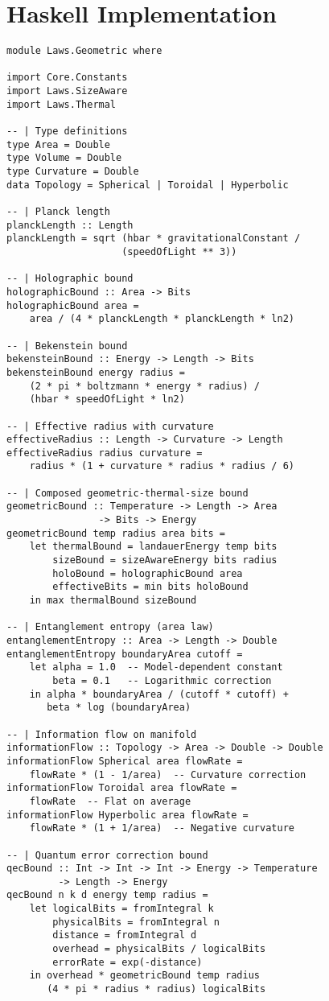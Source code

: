 \documentclass[11pt,a4paper]{article}
\theoremstyle{definition}
\begin{document}
\section{Haskell Implementation}

\begin{lstlisting}
module Laws.Geometric where

import Core.Constants
import Laws.SizeAware
import Laws.Thermal

-- | Type definitions
type Area = Double
type Volume = Double
type Curvature = Double
data Topology = Spherical | Toroidal | Hyperbolic

-- | Planck length
planckLength :: Length
planckLength = sqrt (hbar * gravitationalConstant / 
                    (speedOfLight ** 3))

-- | Holographic bound
holographicBound :: Area -> Bits
holographicBound area =
    area / (4 * planckLength * planckLength * ln2)

-- | Bekenstein bound
bekensteinBound :: Energy -> Length -> Bits
bekensteinBound energy radius =
    (2 * pi * boltzmann * energy * radius) / 
    (hbar * speedOfLight * ln2)

-- | Effective radius with curvature
effectiveRadius :: Length -> Curvature -> Length
effectiveRadius radius curvature =
    radius * (1 + curvature * radius * radius / 6)

-- | Composed geometric-thermal-size bound
geometricBound :: Temperature -> Length -> Area 
                -> Bits -> Energy
geometricBound temp radius area bits =
    let thermalBound = landauerEnergy temp bits
        sizeBound = sizeAwareEnergy bits radius
        holoBound = holographicBound area
        effectiveBits = min bits holoBound
    in max thermalBound sizeBound

-- | Entanglement entropy (area law)
entanglementEntropy :: Area -> Length -> Double
entanglementEntropy boundaryArea cutoff =
    let alpha = 1.0  -- Model-dependent constant
        beta = 0.1   -- Logarithmic correction
    in alpha * boundaryArea / (cutoff * cutoff) + 
       beta * log (boundaryArea)

-- | Information flow on manifold
informationFlow :: Topology -> Area -> Double -> Double
informationFlow Spherical area flowRate = 
    flowRate * (1 - 1/area)  -- Curvature correction
informationFlow Toroidal area flowRate = 
    flowRate  -- Flat on average
informationFlow Hyperbolic area flowRate = 
    flowRate * (1 + 1/area)  -- Negative curvature

-- | Quantum error correction bound
qecBound :: Int -> Int -> Int -> Energy -> Temperature 
         -> Length -> Energy
qecBound n k d energy temp radius =
    let logicalBits = fromIntegral k
        physicalBits = fromIntegral n
        distance = fromIntegral d
        overhead = physicalBits / logicalBits
        errorRate = exp(-distance)
    in overhead * geometricBound temp radius 
       (4 * pi * radius * radius) logicalBits
\end{lstlisting}
\end{document}
